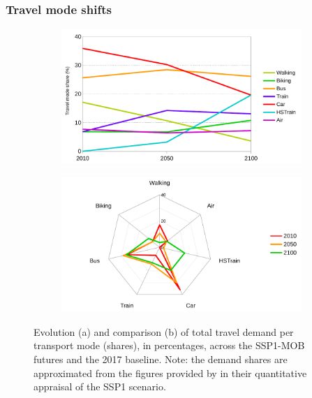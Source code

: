 \subsubsection*{Travel mode shifts}
 
\begin{figure}
		\centering
  \begin{subfigure}{0.8\textwidth}
    \includegraphics[width=\linewidth]{figures/line_travel-demand-shares.pdf}
    \caption{}
    \label{fig:results:line_travel-demand-shares}
  \end{subfigure}
  \begin{subfigure}{0.8\textwidth}
    \includegraphics[width=\linewidth]{figures/radar_travel-demand-shares.pdf}
    \caption{}
    \label{fig:results:radar_travel-demand-shares}
  \end{subfigure}
  \caption[Evolution and comparison of travel demand shares in SSP1-MOB.]{Evolution (a) and comparison (b) of total travel demand per transport mode (shares), in percentages, across the SSP1-MOB futures and the 2017 baseline. Note: the demand shares are approximated from the figures provided by \textcite{vuuren2017_Energylanduse} in their quantitative appraisal of the SSP1 scenario.}
\end{figure}

